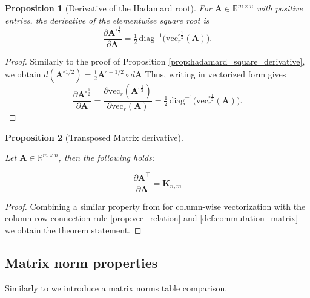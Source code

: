 \documentclass{article}
\newtheorem{proposition}{Proposition}
\begin{document}
\begin{proposition}[Derivative of the Hadamard root]\label{prop:hadamard_root_derivative}
For $\mathbf{A} \in \mathbb{R}^{m \times n}$ with positive entries, the derivative of the elementwise square root is
\[
    \frac{\partial \mathbf{A}^{\circ \frac{1}{2}}}{\partial \mathbf{A}}
    = \tfrac{1}{2}\, \mathrm{diag}^{-1}\!\big(\mathrm{vec}_r^{\circ \frac{1}{2}}(\mathbf{A})\big).
\]
\end{proposition}
\begin{proof}
Similarly to the proof of Proposition \ref{prop:hadamard_square_derivative}, we obtain $d(\mathbf{A}^{\circ 1/2}) = \frac{1}{2}\mathbf{A}^{\circ -1/2} \circ d\mathbf{A}$ 
Thus, writing in vectorized form gives
\[
    \frac{\partial \mathbf{A}^{\circ \frac{1}{2}}}{\partial \mathbf{A}}
    = \frac{\partial \mathrm{vec}_r(\mathbf{A}^{\circ \frac{1}{2}})}{\partial \mathrm{vec}_r(\mathbf{A})} = \tfrac{1}{2}\, \mathrm{diag}^{-1}\!\big(\mathrm{vec}_r^{\circ \frac{1}{2}}(\mathbf{A})\big).
\]
\end{proof}

\begin{proposition} [Transposed Matrix derivative] \label{prop:transposed_matrix_derivative}

Let $\mathbf{A} \in \mathbb{R}^{m \times n}$, then the following holds:

\begin{equation*}
    \frac{\partial \mathbf{A}^\top}{\partial \mathbf{A}} = \mathbf{K}_{n, m}
\end{equation*}
    
\end{proposition} 

\begin{proof}
    Combining a similar property from \cite{magnus1988matrix} for column-wise vectorization with the column-row connection rule \ref{prop:vec_relation} and \ref{def:commutation_matrix} we obtain the theorem statement.
\end{proof}


\subsection{Matrix norm properties}

Similarly to \cite{petersen2012matrix} we introduce a matrix norms table comparison.
\end{document}
